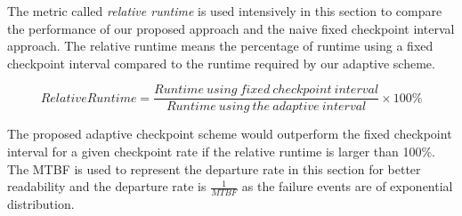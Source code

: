 \documentclass[times, 12pt, onecolumn]{article}
\begin{document}
The metric called \emph{relative runtime} is used intensively in this section to compare the performance of our 
proposed approach and the naive fixed checkpoint interval approach. The relative runtime means the percentage of 
runtime using a fixed checkpoint interval compared to the runtime required by our adaptive scheme. 

\begin{equation}
Relative Runtime = \frac{Runtime\ using\ fixed\ checkpoint\ interval}{Runtime\ using\ the\ adaptive\ interval} \times 100\%
\end{equation}

The proposed adaptive checkpoint scheme would outperform the fixed checkpoint interval for a given checkpoint rate if the relative 
runtime is larger than 100\%. The MTBF is used to represent the departure rate in this section for better readability 
and the departure rate is $\frac{1}{MTBF}$ as the failure events are of exponential distribution.   
\end{document}
